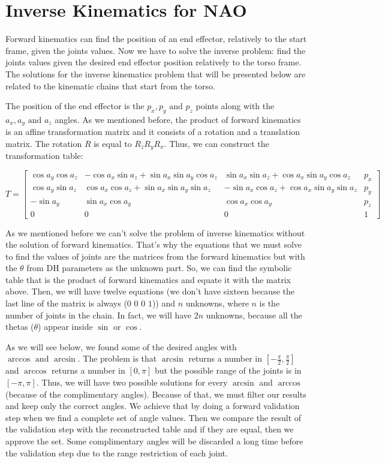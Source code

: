 \section{Inverse Kinematics for NAO}
Forward kinematics can find the position of an end effector, relatively to the start frame, given the joints values. Now we have to solve the inverse problem: find the joints values given the desired end effector position relatively to the torso frame. The solutions for the inverse kinematics problem that will be presented below are related to the kinematic chains that start from the torso.

The position of the end effector is the $p_x,p_y\text{ and }p_z$ points along with the $a_x,a_y\text{ and }a_z$ angles. As we mentioned before, the product of forward kinematics is an affine transformation matrix and it consists of a rotation and a translation matrix. The rotation $R$ is equal to $R_zR_yR_x$. Thus, we can construct the transformation table:

\begin{scriptsize}
\[
T = 
\begin{bmatrix}
\cos a_y\cos a_z & -\cos a_x\sin a_z + \sin a_x\sin a_y\cos a_z & \sin a_x\sin a_z + \cos a_x\sin a_y\cos a_z & p_x\\
\cos a_y\sin a_z & \cos a_x\cos a_z + \sin a_x\sin a_y\sin a_z & -\sin a_x\cos a_z + \cos a_x\sin a_y\sin a_z & p_y\\
-\sin a_y & \sin a_x\cos a_y & \cos a_x\cos a_y & p_z\\
0 & 0 & 0 & 1
\end{bmatrix}
\]
\end{scriptsize}
As we mentioned before we can't solve the problem of inverse kinematics without the solution of forward kinematics. That's why the equations that we must solve to find the values of joints are the matrices from the forward kinematics but with the $\theta$ from DH parameters as the unknown part. So, we can find the symbolic table that is the product of forward kinematics and equate it with the matrix above. Then, we will have twelve equations (we don't have sixteen because the last line of the matrix is always ($0$ $0$ $0$ $1$)) and $n$ unknowns, where $n$ is the number of joints in the chain. In fact, we will have $2n$ unknowns, because all the thetas ($\theta$) appear inside $\sin$ or $\cos$.

As we will see below, we found some of the desired angles with $\arccos \text{ and }\arcsin$. The problem is that $\arcsin$ returns a number in $\left[-\tfrac{\pi}{2},\tfrac{\pi}{2}\right]$ and $\arccos$ returns a number in $\left[0,\pi\right]$ but the possible range of the joints is in $\left[-\pi,\pi\right]$. Thus, we will have two possible solutions for every $\arcsin$ and $\arccos$ (because of the complimentary angles). Because of that, we must filter our results and keep only the correct angles. We achieve that by doing a forward validation step when we find a complete set of angle values. Then we compare the result of the validation step with the reconstructed table and if they are equal, then we approve the set. Some complimentary angles will be discarded a long time before the validation step due to the range restriction of each joint.

